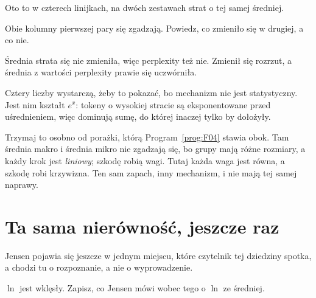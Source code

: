 \begin{fr}
Oto to w czterech linijkach, na dwóch zestawach strat o tej samej średniej.


Obie kolumny pierwszej pary się zgadzają. Powiedz, co zmieniło się w drugiej,
a co nie.
\dotline
\nextframe
\end{fr}

\begin{fr}
\begin{ansblock}
Średnia strata się nie zmieniła, więc perplexity też nie. Zmienił się rozrzut,
a średnia z wartości perplexity prawie się uczwórniła.
\end{ansblock}

Cztery liczby wystarczą, żeby to pokazać, bo mechanizm nie jest statystyczny.
Jest nim kształt $e^{x}$: tokeny o wysokiej stracie są eksponentowane przed
uśrednieniem, więc dominują sumę, do której inaczej tylko by dołożyły.

\begin{note}
Trzymaj to osobno od porażki, którą Program~\ref{prog:F04} stawia obok. Tam
średnia makro i średnia mikro nie zgadzają się, bo grupy mają różne rozmiary,
a każdy krok jest \emph{liniowy}; szkodę robią wagi. Tutaj każda waga jest
równa, a szkodę robi krzywizna. Ten sam zapach, inny mechanizm, i nie mają tej
samej naprawy.
\end{note}
\end{fr}

\section{Ta sama nierówność, jeszcze raz}
\label{sec:P19-elbo}

\begin{fr}
Jensen pojawia się jeszcze w jednym miejscu, które czytelnik tej dziedziny
spotka, a chodzi tu o rozpoznanie, a nie o wyprowadzenie.

$\ln$ jest wklęsły. Zapisz, co Jensen mówi wobec tego o $\ln$ ze średniej.
\nextframe
\end{fr}


